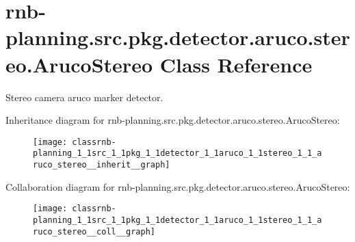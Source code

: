 \hypertarget{classrnb-planning_1_1src_1_1pkg_1_1detector_1_1aruco_1_1stereo_1_1_aruco_stereo}{}\section{rnb-\/planning.src.\+pkg.\+detector.\+aruco.\+stereo.\+Aruco\+Stereo Class Reference}
\label{classrnb-planning_1_1src_1_1pkg_1_1detector_1_1aruco_1_1stereo_1_1_aruco_stereo}


Stereo camera aruco marker detector.  




Inheritance diagram for rnb-\/planning.src.\+pkg.\+detector.\+aruco.\+stereo.\+Aruco\+Stereo\+:\nopagebreak
\begin{figure}[H]
\begin{center}
\leavevmode
\texttt{[image: classrnb-planning\_1\_1src\_1\_1pkg\_1\_1detector\_1\_1aruco\_1\_1stereo\_1\_1\_aruco\_stereo\_\_inherit\_\_graph]}
\end{center}
\end{figure}


Collaboration diagram for rnb-\/planning.src.\+pkg.\+detector.\+aruco.\+stereo.\+Aruco\+Stereo\+:\nopagebreak
\begin{figure}[H]
\begin{center}
\leavevmode
\texttt{[image: classrnb-planning\_1\_1src\_1\_1pkg\_1\_1detector\_1\_1aruco\_1\_1stereo\_1\_1\_aruco\_stereo\_\_coll\_\_graph]}
\end{center}
\end{figure}
